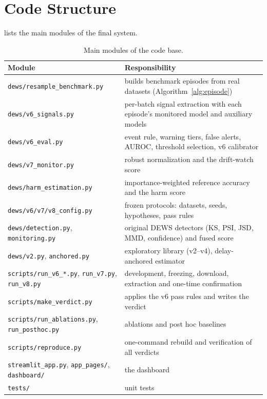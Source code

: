 \section{Code Structure}
 lists the main modules of the final system.

\begin{table}[H]
\caption{Main modules of the code base.}
\label{tab:code}
\centering
\small
\begin{tabularx}{\textwidth}{@{}p{5.3cm}X@{}}
\toprule
Module & Responsibility \\
\midrule
\texttt{dews/resample\_benchmark.py} & builds benchmark episodes from real datasets (Algorithm~\ref{alg:episode}) \\
\texttt{dews/v6\_signals.py} & per-batch signal extraction with each episode's monitored model and auxiliary models \\
\texttt{dews/v6\_eval.py} & event rule, warning tiers, false alerts, AUROC, threshold selection, v6 calibrator \\
\texttt{dews/v7\_monitor.py} & robust normalization and the drift-watch score \\
\texttt{dews/harm\_estimation.py} & importance-weighted reference accuracy and the harm score \\
\texttt{dews/v6/v7/v8\_config.py} & frozen protocols: datasets, seeds, hypotheses, pass rules \\
\texttt{dews/detection.py}, \texttt{monitoring.py} & original DEWS detectors (KS, PSI, JSD, MMD, confidence) and fused score \\
\texttt{dews/v2.py}, \texttt{anchored.py} & exploratory library (v2--v4), delay-anchored estimator \\
\texttt{scripts/run\_v6\_*.py}, \texttt{run\_v7.py}, \texttt{run\_v8.py} & development, freezing, download, extraction and one-time confirmation \\
\texttt{scripts/make\_verdict.py} & applies the v6 pass rules and writes the verdict \\
\texttt{scripts/run\_ablations.py}, \texttt{run\_posthoc.py} & ablations and post hoc baselines \\
\texttt{scripts/reproduce.py} & one-command rebuild and verification of all verdicts \\
\texttt{streamlit\_app.py}, \texttt{app\_pages/}, \texttt{dashboard/} & the dashboard \\
\texttt{tests/} & unit tests \\
\bottomrule
\end{tabularx}
\end{table}

